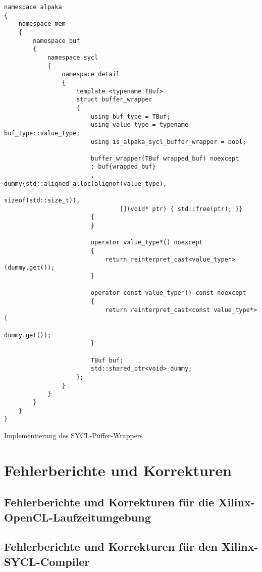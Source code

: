 \begin{code}
    \begin{verbatim}
namespace alpaka
{
    namespace mem
    {
        namespace buf
        {
            namespace sycl
            {
                namespace detail
                {
                    template <typename TBuf>
                    struct buffer_wrapper
                    {
                        using buf_type = TBuf;
                        using value_type = typename buf_type::value_type;
                        using is_alpaka_sycl_buffer_wrapper = bool;

                        buffer_wrapper(TBuf wrapped_buf) noexcept
                        : buf{wrapped_buf}
                        , dummy{std::aligned_alloc(alignof(value_type),
                                                   sizeof(std::size_t)),
                                [](void* ptr) { std::free(ptr); }}
                        {
                        }

                        operator value_type*() noexcept
                        {
                            return reinterpret_cast<value_type*>(dummy.get());
                        }

                        operator const value_type*() const noexcept
                        {
                            return reinterpret_cast<const value_type*>(
                                                                dummy.get());
                        }

                        TBuf buf;
                        std::shared_ptr<void> dummy;
                    };
                }
            }
        }
    }
}
    \end{verbatim}
    \caption{Implementierung des SYCL-Puffer-Wrappers}
\end{code}

\chapter{Fehlerberichte und Korrekturen}
\label{anhang:fehler}

\section{Fehlerberichte und Korrekturen für die Xilinx-OpenCL-Laufzeitumgebung}
\label{anhang:fehler:xrt}

\section{Fehlerberichte und Korrekturen für den Xilinx-SYCL-Compiler}
\label{anhang:fehler:xilinx}

